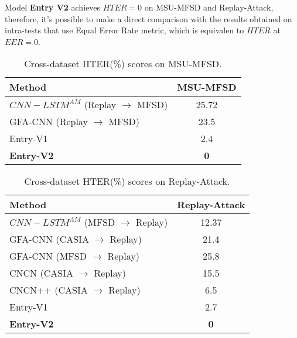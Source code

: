 \documentclass[10pt,twocolumn,letterpaper]{article}
\begin{document}
Model \textbf{Entry V2} achieves $HTER = 0$ on MSU-MFSD and Replay-Attack, therefore, it's possible to make a direct comparison with the results obtained on intra-tests that use Equal Error Rate metric, which is equivalen to $HTER$ at $EER = 0$.

\begin{table}[h]
  \centering
  \begin{tabular}{@{}lc@{}}
    \toprule
    \textbf{Method} & \textbf{MSU-MFSD} \\
    \midrule
    \midrule
    $CNN-LSTM^{AM}$ (Replay $\rightarrow$ MFSD)\cite{CNN-LSTM} & 25.72 \\
    GFA-CNN (Replay $\rightarrow$ MFSD)\cite{GFA-CNN} & 23.5 \\
    Entry-V1 & 2.4 \\
    \textbf{Entry-V2} & \textbf{0} \\
    \bottomrule
  \end{tabular}
  \caption{Cross-dataset HTER(\%) scores on MSU-MFSD\cite{MFSD}.}
  \label{tab:cross-test}
\end{table}


\begin{table}[h]
  \centering
  \begin{tabular}{@{}lc@{}}
    \toprule
    \textbf{Method} & \textbf{Replay-Attack} \\
    \midrule
    \midrule
    $CNN-LSTM^{AM}$ (MFSD $\rightarrow$ Replay)\cite{CNN-LSTM} & 12.37 \\
    GFA-CNN (CASIA $\rightarrow$ Replay)\cite{GFA-CNN} & 21.4 \\
    GFA-CNN (MFSD $\rightarrow$ Replay)\cite{GFA-CNN} & 25.8 \\
    CNCN (CASIA $\rightarrow$ Replay)\cite{CDCNN} & 15.5 \\
    CNCN++ (CASIA $\rightarrow$ Replay)\cite{CDCNN} & 6.5 \\
    Entry-V1 & 2.7 \\
    \textbf{Entry-V2} & \textbf{0} \\
\bottomrule
  \end{tabular}
  \caption{Cross-dataset HTER(\%) scores on Replay-Attack\cite{mci/Chingovska2012}.}
  \label{tab:cross-test}
\end{table}
\end{document}
